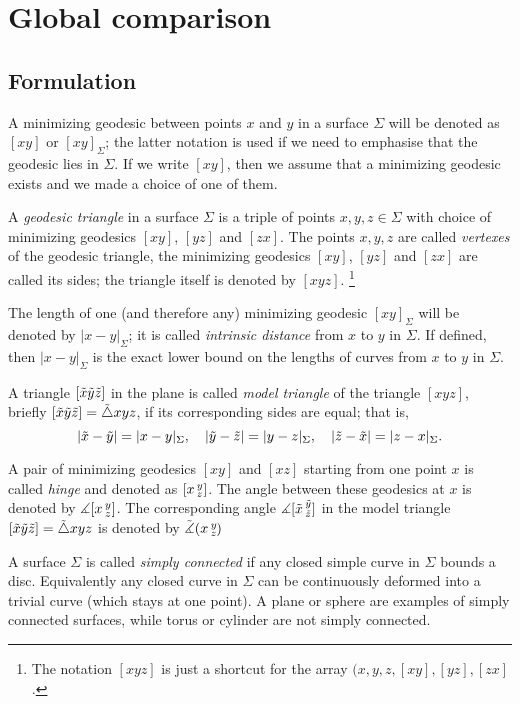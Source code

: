 \chapter{Global comparison}

\section{Formulation}

A minimizing geodesic between points $x$ and $y$ in a surface $\Sigma$ will be denoted as $[xy]$ or $[xy]_\Sigma$;
the latter notation is used if we need to emphasise that the geodesic lies in $\Sigma$.
If we write $[xy]$, then we assume that a minimizing geodesic exists and we made a choice of one of them.

A \emph{geodesic triangle} in a surface $\Sigma$ is a triple of points $x,y,z\in \Sigma$ with choice of minimizing geodesics $[xy]$, $[yz]$ and $[zx]$.
The points $x,y,z$ are called \emph{vertexes} of the geodesic triangle,
the minimizing geodesics $[xy]$, $[yz]$ and $[zx]$ are called its sides;
the triangle itself is denoted by $[xyz]$.%
\footnote{The notation $[xyz]$ is just a shortcut for the array $(x,y,z,[xy], [yz], [zx]$.}

The length of one (and therefore any) minimizing geodesic $[xy]_\Sigma$ will be denoted by $|x-y|_\Sigma$; it is called \emph{intrinsic distance} from $x$ to $y$ in $\Sigma$.
If defined, then $|x-y|_\Sigma$ is the exact lower bound on the lengths of curves from $x$ to $y$ in $\Sigma$. 

A triangle $[\~x\~y\~z]$ in the plane is called \emph{model triangle} of the triangle $[xyz]$,
briefly $[\~x\~y\~z]=\~\triangle xyz$, if its corresponding sides are equal;
that is,
\[|\~x-\~y|=|x-y|_\Sigma,
\quad
|\~y-\~z|=|y-z|_\Sigma,
\quad
|\~z-\~x|=|z-x|_\Sigma.
\]

A pair of minimizing geodesics $[xy]$ and $[xz]$ starting from one point $x$ is called \emph{hinge} and denoted as $\hinge xyz$.
The angle between these geodesics at $x$ is denoted by $\measuredangle\hinge xyz$.
The corresponding angle $\measuredangle\hinge {\~x}{\~y}{\~z}$ in the model triangle $[\~x\~y\~z]=\~\triangle xyz$ is denoted by $\angk xyz$

A surface $\Sigma$ is called \emph{simply connected} if any closed simple curve in $\Sigma$ bounds a disc.
Equivalently any closed curve in $\Sigma$ can be continuously deformed into a trivial curve (which stays at one point).
A plane or sphere are examples of simply connected surfaces, while torus or cylinder are not simply connected.


